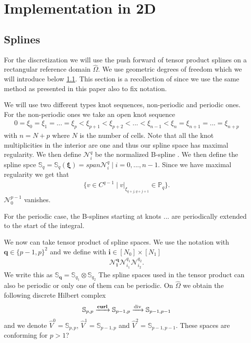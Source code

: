 \documentclass[../master_thesis.tex]{subfiles}
\begin{document}
\section{Implementation in 2D}

\subsection{Splines}

For the discretization we will use the push forward of tensor product splines 
on a rectangular reference domain $\hat{\Omega}$. We use geometric degrees of freedom
which we will introduce below \ref{}. This section is a recollection 
 of \cite[Sec. 4.2]{broken FEEC framework on mapped multipatch} 
since we use the same method as presented in this paper also to fix notation. 

We will use two different types knot sequences, non-periodic and periodic ones. 
For the non-periodic ones we take an open knot sequence 
\begin{align*}
    0 =  \xi_0 = \xi_1 = ... = \xi_p < \xi_{p+1} < \xi_{p+2} < ... < \xi_{n-1} < \xi_n 
    = \xi_{n+1} = ... = \xi_{n+p}
\end{align*}
with $n = N + p$ where $N$ is the number of cells.
Note that all the knot multiplicities in the interior are one and thus our spline 
space has maximal regularity. We then define 
$\mathcal{N}_i^q$ be the normalized B-spline \cite[Ref. 46, Def.4.19]{multipatch paper}.
We then define the spline spce $\mathbb{S}_q = \mathbb{S}_q(\bm{\xi}) = 
span{\mathcal{N}_i^q \mid i = 0, ..., n-1}$. Since we have maximal regularity 
we get that 
\begin{align*}
    \{ v \in C^{q-1} \mid v |_{\xi_{q+j, q+j+1}} \in \mathbb{P}_q \}.
\end{align*}
$\mathcal{N}_0^{p-1} $ vanishes.

For the periodic case, the B-splines starting at knots ... are periodically 
extended to the start of the integral. 

We now can take tensor product of spline spaces. We use the notation 
with $\mathbf{q} \in \{p-1,p\}^2$ and we define with $\mathbf{i} \in [N_0 ] \times [ N_1 ]$
\begin{align*}
    \mathcal{N}_\mathbf{i}^\mathbf{q} \mathcal{N}_{i_1}^{q_1} \mathcal{N}_{i_2}^{q_2}.
\end{align*}
We write this as $\mathbb{S}_\mathbf{q} = \mathbb{S}_{q_1} \otimes \mathbb{S}_{q_2}$ 
The spline spaces used in the tensor product can also be periodic or only one of them 
can be periodic.
On $\hat{\Omega}$ we obtain the following discrete Hilbert complex 
\begin{align*}
    \mathbb{S}_{p,p} \xrightarrow{\veccurl} \mathbb{S}_{p-1,p} \xrightarrow{\diver} \mathbb{S}_{p-1,p-1}
\end{align*}
and we denote $\hat{V}^0 = \mathbb{S}_{p,p}$, $\hat{V}^1 = \mathbb{S}_{p-1,p}$ 
and $\hat{V}^2 = \mathbb{S}_{p-1,p-1}$. These spaces are conforming for $p>1$?
\end{document}
